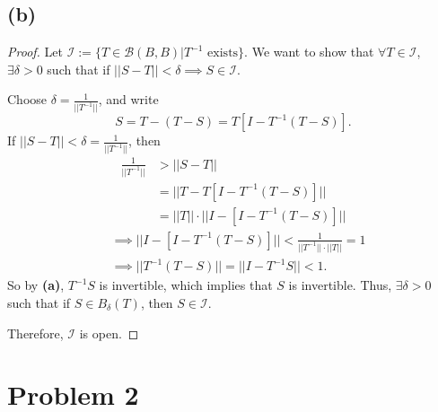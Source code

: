 \documentclass{article}
\begin{document}
\subsection*{(b)}
\begin{proof}
	Let $\mathcal{I} := \{T\in\mathcal{B}(B,B) | T^{-1} \textrm{ exists}\}$. We want to show that $\forall T\in\mathcal{I}$, $\exists \delta>0$ such that if $||S-T||<\delta \implies S\in\mathcal{I}$.
	
	Choose $\delta = \frac{1}{||T^{-1}||}$, and write 
	\begin{equation}
		S = T - (T-S) = T\left[I-T^{-1}\left(T-S\right)\right].
	\end{equation}
	If $||S-T||<\delta = \frac{1}{||T^{-1}||}$, then
	\begin{align}
		\frac{1}{||T^{-1}||} &> ||S-T|| \\
		&= ||T-T\left[I-T^{-1}(T-S)\right]|| \\
		&= ||T||\cdot||I-\left[I-T^{-1}(T-S)\right]||
	\end{align}
	\begin{align}
		&\implies ||I-\left[I-T^{-1}(T-S)\right]|| < \frac{1}{||T^{-1}||\cdot||T||} = 1 \\
		&\implies ||T^{-1}(T-S)|| = ||I-T^{-1}S|| < 1.
	\end{align}
	So by \textbf{(a)}, $T^{-1}S$ is invertible, which implies that $S$ is invertible. Thus, $\exists \delta>0$ such that if $S\in B_{\delta}(T)$, then $S\in\mathcal{I}$.
	
	Therefore, $\mathcal{I}$ is open.
\end{proof}

\section*{Problem 2}
\end{document}
